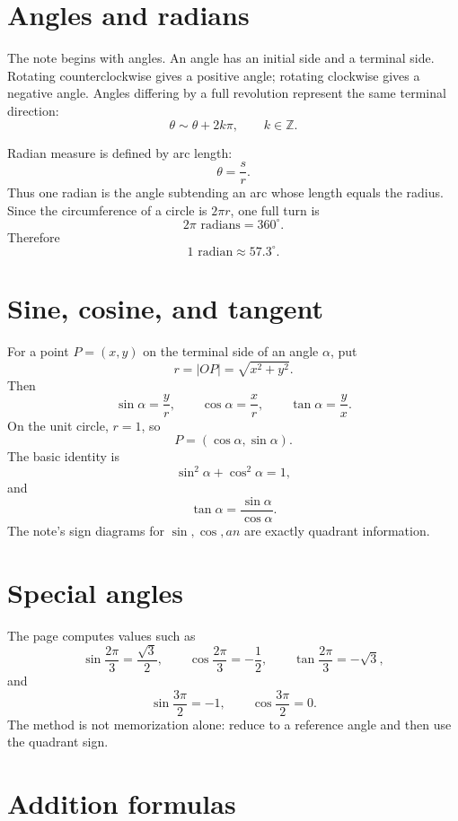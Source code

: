 
\section{Angles and radians}

The note begins with angles.  An angle has an initial side and a terminal side.  Rotating counterclockwise gives a positive angle; rotating clockwise gives a negative angle.  Angles differing by a full revolution represent the same terminal direction:
\[
  \theta\sim\theta+2k\pi,\qquad k\in\mathbb Z.
\]

Radian measure is defined by arc length:
\[
  \theta=\frac{s}{r}.
\]
Thus one radian is the angle subtending an arc whose length equals the radius.  Since the circumference of a circle is \(2\pi r\), one full turn is
\[
  2\pi\text{ radians}=360^\circ.
\]
Therefore
\[
  1\text{ radian}\approx57.3^\circ.
\]

\section{Sine, cosine, and tangent}

For a point \(P=(x,y)\) on the terminal side of an angle \(\alpha\), put
\[
  r=|OP|=\sqrt{x^2+y^2}.
\]
Then
\[
  \sin\alpha=\frac yr,\qquad
  \cos\alpha=\frac xr,\qquad
  \tan\alpha=\frac yx.
\]
On the unit circle, \(r=1\), so
\[
  P=(\cos\alpha,\sin\alpha).
\]
The basic identity is
\[
  \sin^2\alpha+\cos^2\alpha=1,
\]
and
\[
  \tan\alpha=\frac{\sin\alpha}{\cos\alpha}.
\]
The note's sign diagrams for \(\sin,\cos,	an\) are exactly quadrant information.

\section{Special angles}

The page computes values such as
\[
  \sin\frac{2\pi}{3}=\frac{\sqrt3}{2},\qquad
  \cos\frac{2\pi}{3}=-\frac12,\qquad
  \tan\frac{2\pi}{3}=-\sqrt3,
\]
and
\[
  \sin\frac{3\pi}{2}=-1,\qquad
  \cos\frac{3\pi}{2}=0.
\]
The method is not memorization alone: reduce to a reference angle and then use the quadrant sign.

\section{Addition formulas}

